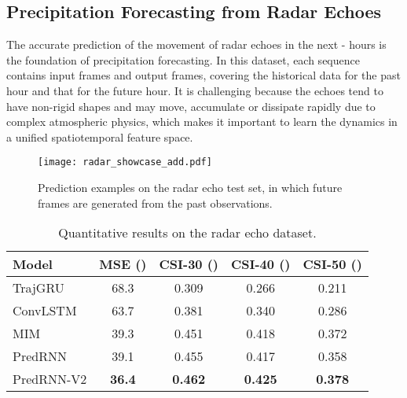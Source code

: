 \documentclass[10pt,journal,compsoc]{IEEEtran}
\begin{document}
\subsection{Precipitation Forecasting from Radar Echoes}

The accurate prediction of the movement of radar echoes in the next - hours is the foundation of precipitation forecasting. In this dataset, each sequence contains  input frames and  output frames, covering the historical data for the past hour and that for the future hour. It is challenging because the echoes tend to have non-rigid shapes and may move, accumulate or dissipate rapidly due to complex atmospheric physics, which makes it important to learn the dynamics in a unified spatiotemporal feature space.




\begin{figure*}[t]
  \centering
  \texttt{[image: radar\_showcase\_add.pdf]}
  \vskip -0.05in
  \caption{Prediction examples on the radar echo test set, in which  future frames are generated from the past  observations.}
  \label{fig:radar}
  \vspace{-10pt}
\end{figure*}


\begin{table}[t]
\vskip 0.05in
  \caption{Quantitative results on the radar echo dataset.}
  \vskip -0.05in
  \label{tab:radar}
  \centering
  \begin{tabular}{lcccc}
    \toprule
    Model & MSE () & CSI-30 () & CSI-40 () & CSI-50 () \\
    \midrule
    TrajGRU \cite{shi2017deep} & 68.3 & 0.309 & 0.266 & 0.211 \\
    ConvLSTM \cite{shi2015convolutional}  & 63.7 & 0.381 & 0.340 & 0.286  \\
    MIM \cite{wang2019memory} & 39.3 & 0.451 & 0.418 & 0.372 \\
    \midrule
    PredRNN & 39.1 & 0.455 & 0.417 & 0.358  \\
    PredRNN-V2 & \textbf{36.4} & \textbf{0.462} & \textbf{0.425} & \textbf{0.378} \\
    \bottomrule
  \end{tabular}
  \vspace{-5pt}
\end{table}
\end{document}
